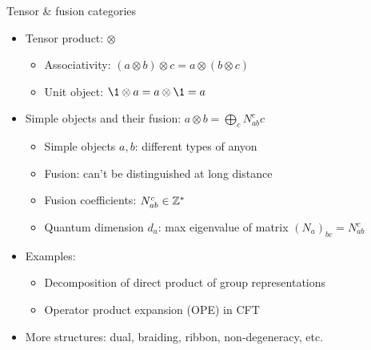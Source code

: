 \documentclass{fdubeamer}
\begin{document}
\begin{frame}{Tensor \& fusion categories}

\begin{itemize}
  \item Tensor product: $\otimes$

    \begin{itemize}
      \item Associativity: $(a\otimes b)\otimes c=a\otimes(b\otimes c)$
      \item Unit object: $\1\otimes a=a\otimes\1=a$
    \end{itemize}

  \item Simple objects and their fusion: $a\otimes b=\bigoplus_c N_{ab}^c c$

    \begin{itemize}
      \item Simple objects $a,b$: different types of anyon
      \item Fusion: can't be distinguished at long distance
      \item Fusion coefficients: $N_{ab}^c\in\mathbb{Z}^*$
      \item Quantum dimension $d_a$: max eigenvalue of matrix $(N_a)_{bc}=N_{ab}^c$
    \end{itemize}

  \item Examples:

    \begin{itemize}
      \item Decomposition of direct product of group representations
      \item Operator product expansion (OPE) in CFT
    \end{itemize}

  \item More structures: dual, braiding, ribbon, non-degeneracy, etc.
\end{itemize}

\end{frame}
\end{document}
